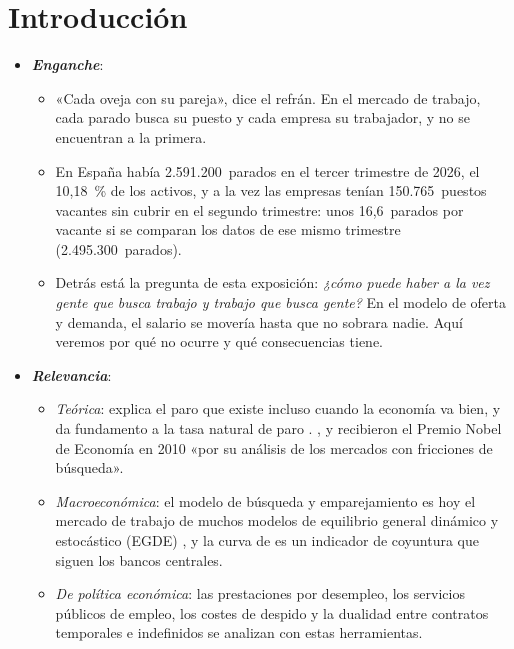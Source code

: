 \documentclass[11pt]{article}
\begin{document}
\tceetitulo

\section*{Introducción}

\begin{itemize}
\item \textbf{\emph{Enganche}}:
  \begin{itemize}
  \item «Cada oveja con su pareja», dice el refrán. En el mercado de trabajo, cada parado busca su puesto y cada empresa su trabajador, y no se encuentran a la primera.
  \item En España había 2.591.200~parados en el tercer trimestre de 2026, el 10,18~\% de los activos\nocite{INE2026EPA3T}, y a la vez las empresas tenían 150.765~puestos vacantes sin cubrir en el segundo trimestre\nocite{Eurostat2026jvs}: unos 16,6~parados por vacante si se comparan los datos de ese mismo trimestre (2.495.300~parados)\nocite{INE2026EPAParados}.
  \item Detrás está la pregunta de esta exposición: \emph{¿cómo puede haber a la vez gente que busca trabajo y trabajo que busca gente?} En el modelo de oferta y demanda, el salario se movería hasta que no sobrara nadie. Aquí veremos por qué no ocurre y qué consecuencias tiene.
  \end{itemize}

\item \textbf{\emph{Relevancia}}:
  \begin{itemize}
  \item \emph{Teórica}: explica el paro que existe incluso cuando la economía va bien, y da fundamento a la tasa natural de paro . ,  y  recibieron el Premio Nobel de Economía en 2010 «por su análisis de los mercados con fricciones de búsqueda»\nocite{Nobel2010DiamondMortensenPissarides}.
  \item \emph{Macroeconómica}: el modelo de búsqueda y emparejamiento es hoy el mercado de trabajo de muchos modelos de equilibrio general dinámico y estocástico (EGDE)\nocite{BlanchardGali2010Labor} , y la curva de  es un indicador de coyuntura que siguen los bancos centrales.
  \item \emph{De política económica}: las prestaciones por desempleo, los servicios públicos de empleo, los costes de despido y la dualidad entre contratos temporales e indefinidos se analizan con estas herramientas.
  \end{itemize}


\end{itemize}
\end{document}
